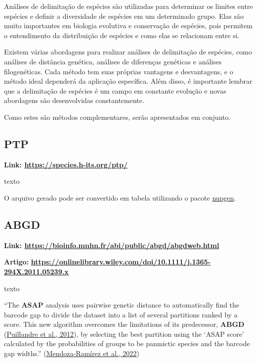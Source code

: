 \documentclass[
  letterpaper,
  DIV=11,
  numbers=noendperiod]{scrreprt}
\begin{document}
Análises de delimitação de espécies são utilizadas para determinar os
limites entre espécies e definir a diversidade de espécies em um
determinado grupo. Elas são muito importantes em biologia evolutiva e
conservação de espécies, pois permitem o entendimento da distribuição de
espécies e como elas se relacionam entre si.

Existem várias abordagens para realizar análises de delimitação de
espécies, como análises de distância genética, análises de diferenças
genéticas e análises filogenéticas. Cada método tem suas próprias
vantagens e desvantagens, e o método ideal dependerá da aplicação
específica. Além disso, é importante lembrar que a delimitação de
espécies é um campo em constante evolução e novas abordagens são
desenvolvidas constantemente.

Como estes são métodos complementares, serão apresentados em conjunto.

\hypertarget{ptp}{%
\subsection{PTP}\label{ptp}}

\textbf{Link: \url{https://species.h-its.org/ptp/}}

texto

O arquivo gerado pode ser convertido em tabela utilizando o pacote
\protect\hyperlink{pacote-nupgen-r}{nupgen}.

\hypertarget{abgd}{%
\subsection{ABGD}\label{abgd}}

\textbf{Link:
\url{https://bioinfo.mnhn.fr/abi/public/abgd/abgdweb.html}}

\textbf{Artigo:}
\href{https://onlinelibrary.wiley.com/doi/10.1111/j.1365-294X.2011.05239.x}{\textbf{https://onlinelibrary.wiley.com/doi/10.1111/j.1365-294X.2011.05239.x}}

texto

\begin{tcolorbox}[enhanced jigsaw, colbacktitle=quarto-callout-important-color!10!white, toprule=.15mm, rightrule=.15mm, opacityback=0, left=2mm, arc=.35mm, breakable, colback=white, bottomtitle=1mm, opacitybacktitle=0.6, toptitle=1mm, leftrule=.75mm, coltitle=black, titlerule=0mm, bottomrule=.15mm, title=\textcolor{quarto-callout-important-color}{\faExclamation}\hspace{0.5em}{Importante}]

``The \textbf{ASAP} analysis uses pairwise genetic distance to
automatically find the barcode gap to divide the dataset into a list of
several partitions ranked by a score. This new algorithm overcomes the
limitations of its predecessor, \textbf{ABGD}
(\href{https://onlinelibrary.wiley.com/doi/10.1111/j.1365-294X.2011.05239.x}{Puillandre
et al., 2012}), by selecting the best partition using the `ASAP score'
calculated by the probabilities of groups to be panmictic species and
the barcode gap widths.''
(\href{https://onlinelibrary.wiley.com/doi/full/10.1002/ece3.9487}{Mendoza-Ramírez
et al., 2022})

\end{tcolorbox}
\end{document}
